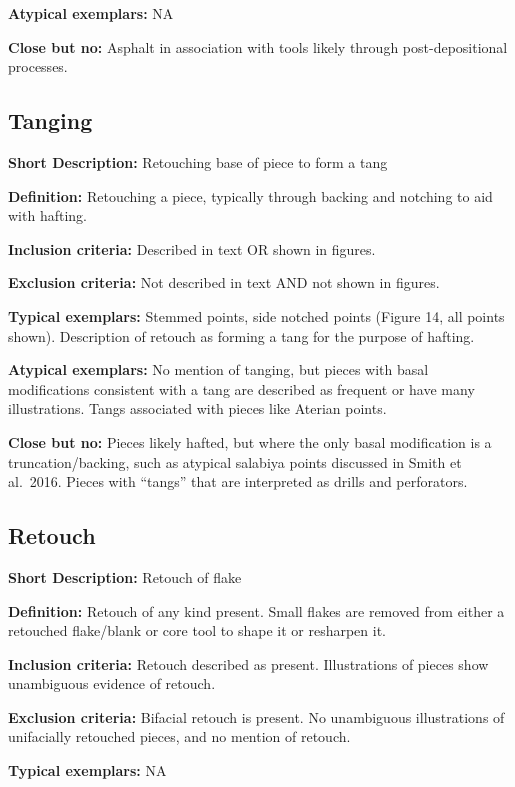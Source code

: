 \documentclass[
]{article}
\begin{document}
\textbf{Atypical exemplars:} NA

\textbf{Close but no:} Asphalt in association with tools likely through
post-depositional processes.

\subsection{Tanging}\label{tanging}

\textbf{Short Description:} Retouching base of piece to form a tang

\textbf{Definition:} Retouching a piece, typically through backing and
notching to aid with hafting.

\textbf{Inclusion criteria:} Described in text OR shown in figures.

\textbf{Exclusion criteria:} Not described in text AND not shown in
figures.

\textbf{Typical exemplars:} Stemmed points, side notched points (Figure
14, all points shown). Description of retouch as forming a tang for the
purpose of hafting.

\textbf{Atypical exemplars:} No mention of tanging, but pieces with
basal modifications consistent with a tang are described as frequent or
have many illustrations. Tangs associated with pieces like Aterian
points.

\textbf{Close but no:} Pieces likely hafted, but where the only basal
modification is a truncation/backing, such as atypical salabiya points
discussed in Smith et al.~2016. Pieces with ``tangs'' that are
interpreted as drills and perforators.

\subsection{Retouch}\label{retouch}

\textbf{Short Description:} Retouch of flake

\textbf{Definition:} Retouch of any kind present. Small flakes are
removed from either a retouched flake/blank or core tool to shape it or
resharpen it.

\textbf{Inclusion criteria:} Retouch described as present. Illustrations
of pieces show unambiguous evidence of retouch.

\textbf{Exclusion criteria:} Bifacial retouch is present. No unambiguous
illustrations of unifacially retouched pieces, and no mention of
retouch.

\textbf{Typical exemplars:} NA
\end{document}
